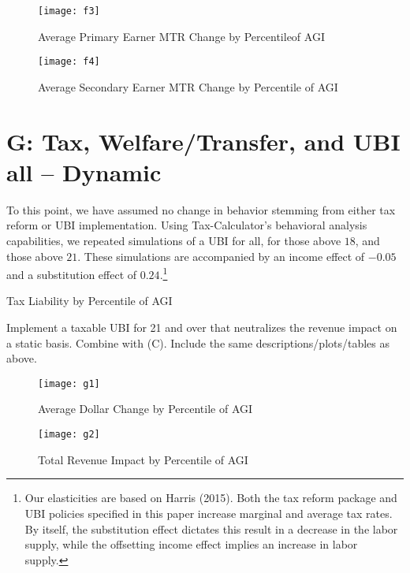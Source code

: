 \documentclass{article}
\begin{document}
\begin{figure}[H]
\centering
\caption{Average Primary Earner MTR Change by Percentileof AGI}
\texttt{[image: f3]}
\end{figure}

\begin{figure}[H]
\centering
\caption{Average Secondary Earner MTR Change by Percentile of AGI}
\texttt{[image: f4]}
\end{figure}

\section{G: Tax, Welfare/Transfer, and UBI all -- Dynamic}
To this point, we have assumed no change in behavior stemming from either tax reform or UBI implementation. Using Tax-Calculator’s behavioral analysis capabilities, we repeated simulations of a UBI for all, for those above $18$, and those above $21$. These simulations are accompanied by an income effect of $-0.05$ and a substitution effect of $0.24$.\footnote{Our elasticities are based on Harris (2015). Both the tax reform package and UBI policies specified in this paper increase marginal and average tax rates. By itself, the substitution effect dictates this result in a decrease in the labor supply, while the offsetting income effect implies an increase in labor supply.}

\begin{table}[H]
\caption{Tax Liability by Percentile of AGI}
\begin{center}
\begin{adjustbox}{max width=\textwidth}

\end{adjustbox}
\end{center}
\end{table}

Implement a taxable UBI for 21 and over that neutralizes the revenue impact on a static basis. Combine with (C). Include the same descriptions/plots/tables as above.



\begin{figure}[H]
\centering
\caption{Average Dollar Change by Percentile of AGI}
\texttt{[image: g1]}
\end{figure}

\begin{figure}[H]
\centering
\caption{Total Revenue Impact by Percentile of AGI}
\texttt{[image: g2]}
\end{figure}
\end{document}
